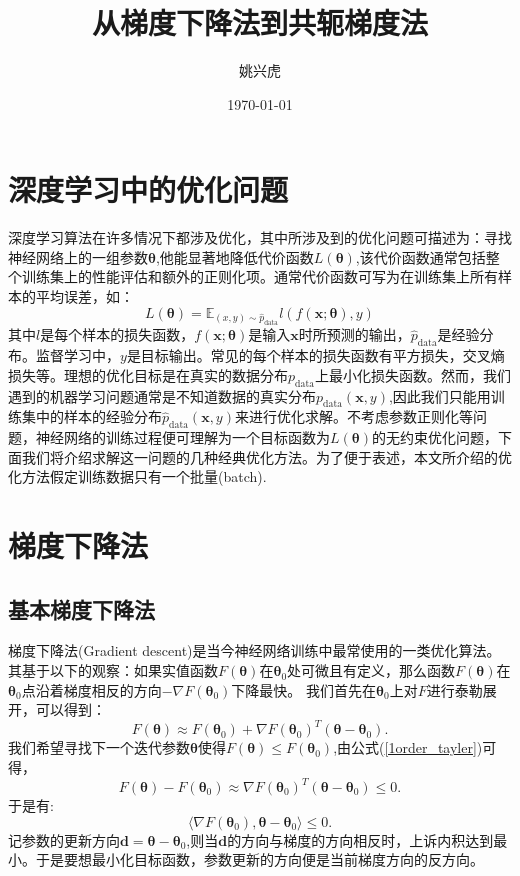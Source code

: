 \documentclass{ctexart}
\title{从梯度下降法到共轭梯度法}
\author{姚兴虎}
\date{\today}
\begin{document}
\maketitle
\section{深度学习中的优化问题}
深度学习算法在许多情况下都涉及优化，其中所涉及到的优化问题可描述为：寻找神经网络上的一组参数$\boldsymbol{\theta}$,他能显著地降低代价函数$L(\boldsymbol{\theta})$,该代价函数通常包括整个训练集上的性能评估和额外的正则化项。通常代价函数可写为在训练集上所有样本的平均误差，如：\\
\begin{equation}
L(\boldsymbol{\theta})=\mathbb{E}_{(x,y)\sim\hat{p}_{\text{data}}}l(f(\mathbf{x};\boldsymbol{\theta}),y)
\end{equation}
其中$l$是每个样本的损失函数，$f(\mathbf{x};\boldsymbol{\theta})$是输入$\mathbf{x}$时所预测的输出，$\hat{p}_{\text{data}}$是经验分布。监督学习中，$y$是目标输出。常见的每个样本的损失函数有平方损失，交叉熵损失等。理想的优化目标是在真实的数据分布$p_{\text{data}}$上最小化损失函数。然而，我们遇到的机器学习问题通常是不知道数据的真实分布$p_{\text{data}}(\mathbf{x},y)$,因此我们只能用训练集中的样本的经验分布$\hat{p}_{\text{data}}(\mathbf{x},y)$来进行优化求解。不考虑参数正则化等问题，神经网络的训练过程便可理解为一个目标函数为$L(\boldsymbol{\theta})$的无约束优化问题，下面我们将介绍求解这一问题的几种经典优化方法。为了便于表述，本文所介绍的优化方法假定训练数据只有一个批量(batch).
\section{梯度下降法}
\subsection{基本梯度下降法}
梯度下降法(Gradient descent)是当今神经网络训练中最常使用的一类优化算法。其基于以下的观察：如果实值函数$F(\boldsymbol{\theta})$在$\boldsymbol{\theta}_0$处可微且有定义，那么函数$F(\boldsymbol{\theta})$在$\boldsymbol{\theta}_0$点沿着梯度相反的方向$-\nabla F(\boldsymbol{\theta}_0)$下降最快。
我们首先在$\boldsymbol{\theta}_0$上对$F$进行泰勒展开，可以得到：
\begin{equation}
F(\boldsymbol{\theta})\approx F(\boldsymbol{\theta}_0)+\nabla F(\boldsymbol{\theta}_0)^T(\boldsymbol{\theta}-\boldsymbol{\theta}_0).\label{1order_tayler}
\end{equation}
我们希望寻找下一个迭代参数$\boldsymbol{\theta}$使得$F(\boldsymbol{\theta})\leqslant F(\boldsymbol{\theta}_0)$,由公式(\ref{1order_tayler})可得，$$F(\boldsymbol{\theta})- F(\boldsymbol{\theta}_0)\approx\nabla F(\boldsymbol{\theta}_0)^T(\boldsymbol{\theta}-\boldsymbol{\theta}_0)\leqslant0.$$于是有:
$$\langle\nabla F(\boldsymbol{\theta}_0),\boldsymbol{\theta}-\boldsymbol{\theta}_0\rangle\leqslant0.$$
记参数的更新方向$\mathbf{d}=\boldsymbol{\theta}-\boldsymbol{\theta}_0$,则当$\mathbf{d}$的方向与梯度的方向相反时，上诉内积达到最小。于是要想最小化目标函数，参数更新的方向便是当前梯度方向的反方向。
\end{document}
